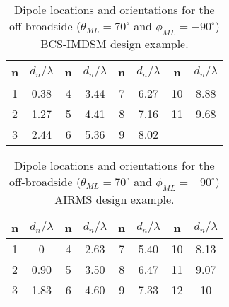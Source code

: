 \documentclass[10pt,final]{IEEEtran}
\begin{document}
\begin{table}
\caption{\rm Dipole locations and orientations for the off-broadside ($\theta_{ML}=70^{\circ}$ and $\phi_{ML}=-90^{\circ}$) BCS-IMDSM design example.} \centering
\begin{tabular}{|c|c|c|c|c|c|c|c|}\hline
n  & $d_{n}/\lambda$ &  n & $d_{n}/\lambda$ &  n & $d_{n}/\lambda$ & n & $d_{n}/\lambda$\\
\hline
1  &  0.38  &  4 &  3.44    &  7 & 6.27   & 10 & 8.88 \\
\hline
2  & 1.27 &  5  &   4.41   &  8 &  7.16  & 11 & 9.68 \\
\hline
3  & 2.44 &   6  &  5.36  & 9 & 8.02 \\
\cline{1-6}
\end{tabular}
\label{tb:CSoffbroad21}
\end{table}

\begin{table}
\caption{\rm Dipole locations and orientations for the off-broadside ($\theta_{ML}=70^{\circ}$ and $\phi_{ML}=-90^{\circ}$) AIRMS design example.} \centering
\begin{tabular}{|c|c|c|c|c|c|c|c|}\hline
n  & $d_{n}/\lambda$ &  n & $d_{n}/\lambda$ &  n & $d_{n}/\lambda$ & n & $d_{n}/\lambda$\\
\hline
1  &  0  &  4 &  2.63    &  7 & 5.40   & 10 & 8.13 \\
\hline
2  & 0.90 &  5  &   3.50   &  8 &  6.47  & 11 & 9.07 \\
\hline
3  & 1.83 &   6  &  4.60   & 9 & 7.33  & 12 & 10\\
\hline
\end{tabular}
\label{tb:reweightedoffbroad2}
\end{table}
\end{document}
